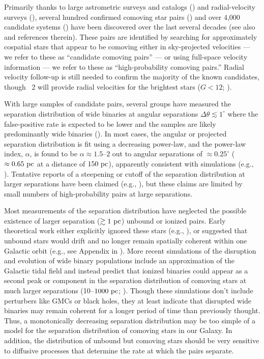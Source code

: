 \documentclass[modern, letterpaper]{aastex61}
\newcommand{\gaia}{\project{Gaia}}
\newcommand{\DR}[1]{\acronym{DR}#1}
\begin{document}
Primarily thanks to large astrometric surveys and catalogs
(\citealt{ESA:1997,Lepine:2005,Gaia-Collaboration:2016}) and radial-velocity
surveys (\citealt{Steinmetz:2006}), several hundred confirmed comoving star
pairs (\citealt{Shaya:2011}) and over 4,000 candidate systems
(\citealt{Gould:2004,Lepine:2007,Tokovinin:2012,Allen:2014,Oh:2017,
Oelkers:2017, Andrews:2017}) have been discovered over the last several decades
(see also \citealt{Chaname:2007} and references therein).
These pairs are identified by searching for approximately cospatial stars that
appear to be comoving either in sky-projected velocities --- we refer to these
as ``candidate comoving pairs'' --- or using full-space velocity information ---
we refer to these as ``high-probability comoving pairs.''
Radial velocity follow-up is still needed to confirm the majority of the known
candidates, though \gaia\ \DR{2} will provide radial velocities for the
brightest stars ($G < 12$; \citealt{Gaia-Collaboration:2016}).

With large samples of candidate pairs, several groups have measured the
separation distribution of wide binaries at angular separations $\Delta \theta
\lesssim 1^\circ$ where the false-positive rate is expected to be lower
and the samples are likely predominantly wide binaries
(\citealt{Chaname:2004,Lepine:2007,Sesar:2008}).
In most cases, the angular or projected separation distribution is fit using a
decreasing power-law, and the power-law index, $\alpha$, is found to be $\alpha
\approx 1.5$--$2$ out to angular separations of $\approx 0.25^\circ$ ($\approx
0.65~\mathrm{pc}$ at a distance of $150~\mathrm{pc}$), apparently consistent with simulations
(e.g., \citealt{Weinberg:1987}).
Tentative reports of a steepening or cutoff of the separation distribution at
larger separations have been claimed (e.g., \citealt{Yoo:2004,Quinn:2009}), but
these claims are limited by small numbers of high-probability pairs at large
separations.

Most measurements of the separation distribution have neglected the possible
existence of larger separation ($\gtrsim 1~\mathrm{pc}$) unbound or ionized pairs.
Early theoretical work either explicitly ignored these stars (e.g.,
\citealt{Weinberg:1987}), or suggested that unbound stars would drift and no
longer remain spatially coherent within one Galactic orbit (e.g., see Appendix
in \citealt{Yoo:2004}).
More recent simulations of the disruption and evolution of wide binary
populations include an approximation of the Galactic tidal field and instead
predict that ionized binaries could appear as a second peak or component in the
separation distribution of comoving stars at much larger separations
(10--$1000~\mathrm{pc}$; \citealt{Jiang:2010}).
Though these simulations don't include perturbers like GMCs or black holes, they
at least indicate that disrupted wide binaries may remain coherent for a longer
period of time than previously thought.
Thus, a monotonically decreasing separation distribution may be too simple of a
model for the separation distribution of comoving stars in our Galaxy.
In addition, the distribution of unbound but comoving stars should be very
sensitive to diffusive processes that determine the rate at which the pairs
separate.
\end{document}
